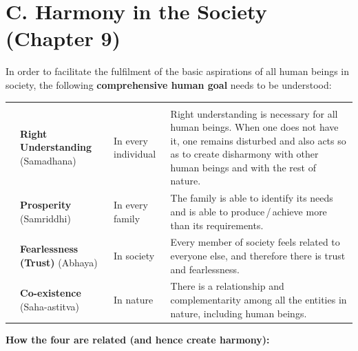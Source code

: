 \section{C. Harmony in the Society (Chapter 9)}


\ans In order to facilitate the fulfilment of the basic aspirations of all
human beings in society, the following \textbf{comprehensive human goal} needs
to be understood:

\renewcommand{\arraystretch}{1.3}
\begin{longtable}{C{7mm} P{45mm} P{26mm} P{62mm}}
\hdr{\#} &  &  &  \\ \hline
\endfirsthead
{}\hdr{\#} &  &  &  \\ \hline
\endhead
{} & \textbf{Right Understanding} (Samadhana) & In every individual &
  Right understanding is necessary for all human beings. When one does not
  have it, one remains disturbed and also acts so as to create disharmony with
  other human beings and with the rest of nature. \\ \hline
{} & \textbf{Prosperity} (Samriddhi) & In every family &
  The family is able to identify its needs and is able to
  produce\,/\,achieve more than its requirements. \\ \hline
{} & \textbf{Fearlessness (Trust)} (Abhaya) & In society &
  Every member of society feels related to everyone else, and therefore there
  is trust and fearlessness. \\ \hline
{} & \textbf{Co-existence} (Saha-astitva) & In nature &
  There is a relationship and complementarity among all the entities in
  nature, including human beings. \\ \hline
\end{longtable}

\textbf{How the four are related (and hence create harmony):}

